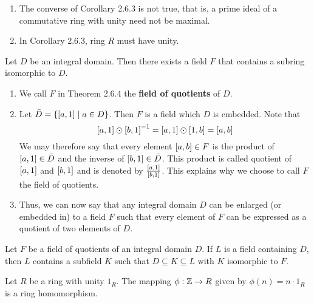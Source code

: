 \begin{remark} \phantom{blank}
    \begin{enumerate}
        \item The converse of Corollary 2.6.3 is not true, that is, a prime ideal of a commutative ring with unity need not be maximal.
        \item In Corollary 2.6.3, ring $R$ must have unity.
    \end{enumerate}
\end{remark}

\begin{theorem}
    Let $D$ be an integral domain. Then there exists a field $F$ that contains a subring isomorphic to $D$.
\end{theorem}

\begin{remark} \phantom{blank}
    \begin{enumerate}
        \item We call $F$ in Theorem 2.6.4 the \textbf{field of quotients} of $D$.
        \item Let $\bar{D} = \qty{\qty[a, 1] \mid a \in D}$. Then $F$ is a field which $D$ is embedded. Note that 
        \[ \qty[a, 1] \odot \qty[b, 1]^{-1} = \qty[a, 1] \odot \qty[1, b] = \qty[a, b] \]
        We may therefore say that every element $\qty[a, b] \in F$ is the product of $\qty[a, 1] \in \bar{D}$ and the inverse of $\qty[b, 1] \in \bar{D}$. This product is called quotient of $\qty[a, 1]$ and $\qty[b, 1]$ and is denoted by $\frac{\qty[a, 1]}{ \qty[b, 1] }$. This explains why we choose to call $F$ the field of quotients. 
        \item Thus, we can now say that any integral domain $D$ can be enlarged (or embedded in) to a field $F$ such that every element of $F$ can be expressed as a quotient of two elements of $D$.
    \end{enumerate}
\end{remark}

\begin{theorem}
    Let $F$ be a field of quotients of an integral domain $D$. If $L$ is a field containing $D$, then $L$ contains a subfield $K$ such that $D \subseteq K \subseteq L$ with $K$ isomorphic to $F$.
\end{theorem}

\begin{theorem}
    Let $R$ be a ring with unity $1_R$. The mapping $\phi : \mathbb{Z} \to R$ given by $\phi(n) = n \cdot 1_R$ is a ring homomorphism.
\end{theorem}

